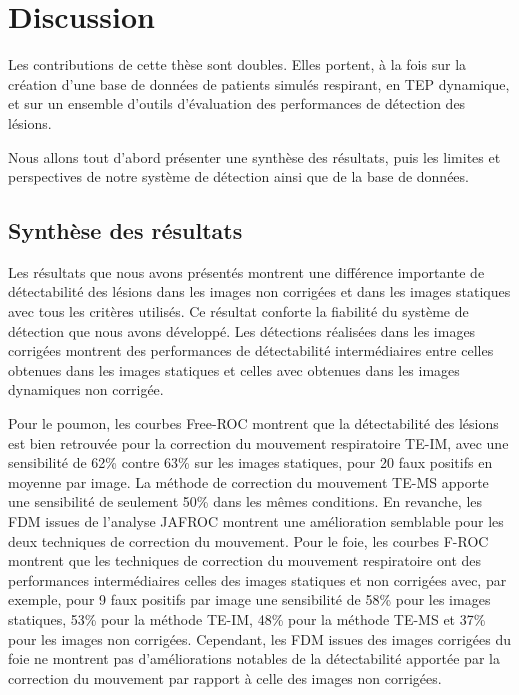 \chapter{Discussion}

Les contributions de cette thèse sont doubles. Elles portent, à la fois sur la
création d'une base de données de patients simulés respirant, en TEP dynamique, et
sur un ensemble d'outils d'évaluation des performances de détection
des lésions.  
 
Nous allons tout d'abord présenter une synthèse des résultats, puis les limites et perspectives de notre système de détection ainsi que de la base de données.

\section{Synthèse des résultats}

Les résultats que nous avons présentés montrent une différence importante de
détectabilité des lésions dans les images non corrigées et dans les images statiques
avec tous les critères utilisés. Ce résultat conforte la fiabilité du système de
détection que nous avons développé. Les détections réalisées dans les images
corrigées montrent des performances de détectabilité intermédiaires entre celles obtenues dans les images statiques et celles avec obtenues dans les images dynamiques non corrigée. 

Pour le poumon, les courbes Free-ROC montrent que la détectabilité des
lésions est bien retrouvée pour la correction du mouvement respiratoire TE-IM, avec une sensibilité de 62\% contre 63\% sur les images statiques, pour
20 faux positifs en moyenne par image. La méthode de correction du mouvement TE-MS apporte une sensibilité de seulement 50\% dans les mêmes conditions. En revanche, les FDM
issues de l'analyse JAFROC montrent une amélioration semblable pour
les deux techniques de correction du mouvement. Pour le foie, les courbes F-ROC
montrent que les techniques de correction du mouvement respiratoire ont des performances intermédiaires celles des images statiques et non
corrigées avec, par exemple, pour 9 faux positifs par image une sensibilité de
58\% pour les images statiques, 53\% pour la méthode TE-IM, 48\% pour la méthode TE-MS et 37\% pour
les images non corrigées. Cependant, les FDM issues des images corrigées du foie
ne montrent pas d'améliorations notables de la détectabilité apportée par la
correction du mouvement par rapport à celle des images non corrigées. 

